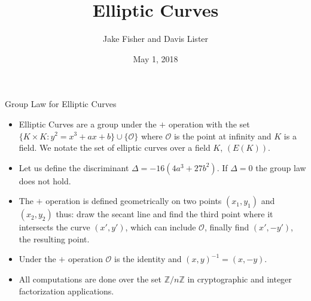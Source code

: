 \documentclass{beamer}
\title{Elliptic Curves}
\author{Jake Fisher and Davis Lister}
\date{May 1, 2018}
\begin{document}
	
	\begin{frame}
		\titlepage
	\end{frame}
	
		\begin{frame}{Group Law for Elliptic Curves}
		\begin{itemize}
			\item Elliptic Curves are a group under the $+$ operation with the set $\lbrace K \times K: y^2=x^3+ax+b \rbrace \cup \lbrace \mathcal{O} \rbrace$ where $\mathcal{O}$ is the point at infinity and $K$ is a field. We notate the set of elliptic curves over a field $K$, $(E(K))$.
			\item Let us define the discriminant $\Delta = -16(4a^3+27b^2)$. If $\Delta = 0$ the group law does not hold.
			\item The $+$ operation is defined geometrically on two points $(x_1,y_1)$ and $(x_2,y_2)$ thus: draw the secant line and find the third point where it intersects the curve $(x',y')$, which can include $\mathcal{O}$, finally find $(x',-y')$, the resulting point.
			\item Under the $+$ operation $\mathcal{O}$ is the identity and $(x,y)^{-1}=(x,-y)$.
			\item All computations are done over the set $\mathbb{Z}/n\mathbb{Z}$ in cryptographic and integer factorization applications.
		\end{itemize}
	\end{frame}
	
\end{document}
